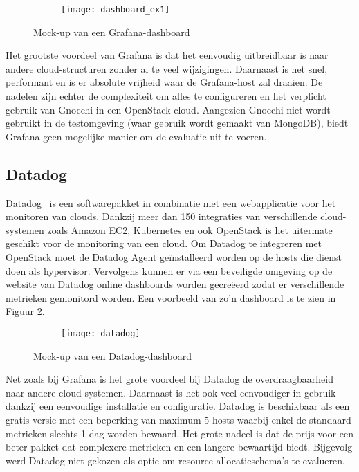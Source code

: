 \begin{figure}
  \centering
  \captionsetup{justification=centering}
  \begin{subfigure}{\textwidth}
    \centering
    \centerline{
      \texttt{[image: dashboard\_ex1]}
    }
  \end{subfigure}
  \caption{Mock-up van een Grafana-dashboard}
  \label{fig:grafana}
\end{figure}

Het grootste voordeel van Grafana is dat het eenvoudig uitbreidbaar is naar andere cloud-structuren zonder al te veel wijzigingen. Daarnaast is het snel, performant en is er absolute vrijheid waar de Grafana-host zal draaien. De nadelen zijn echter de complexiteit om alles te configureren en het verplicht gebruik van Gnocchi in een OpenStack-cloud. Aangezien Gnocchi niet wordt gebruikt in de testomgeving (waar gebruik wordt gemaakt van MongoDB), biedt Grafana geen mogelijke manier om de evaluatie uit te voeren.

\subsection{Datadog}

Datadog~\cite{Datadog} is een softwarepakket in combinatie met een webapplicatie voor het monitoren van clouds. Dankzij meer dan 150 integraties van verschillende cloud-systemen zoals Amazon EC2, Kubernetes en ook OpenStack is het uitermate geschikt voor de monitoring van een cloud. Om Datadog te integreren met OpenStack moet de Datadog Agent geïnstalleerd worden op de hosts die dienst doen als hypervisor. Vervolgens kunnen er via een beveiligde omgeving op de website van Datadog online dashboards worden gecreëerd zodat er verschillende metrieken gemonitord worden. Een voorbeeld van zo'n dashboard is te zien in Figuur \ref{fig:datadog}.

\begin{figure}
  \centering
  \captionsetup{justification=centering}
  \begin{subfigure}{\textwidth}
    \centering
    \centerline{
      \texttt{[image: datadog]}
    }
  \end{subfigure}
  \caption{Mock-up van een Datadog-dashboard}
  \label{fig:datadog}
\end{figure}

Net zoals bij Grafana is het grote voordeel bij Datadog de overdraagbaarheid naar andere cloud-systemen. Daarnaast is het ook veel eenvoudiger in gebruik dankzij een eenvoudige installatie en configuratie. Datadog is beschikbaar als een gratis versie met een beperking van maximum 5 hosts waarbij enkel de standaard metrieken slechts 1 dag worden bewaard. Het grote nadeel is dat de prijs voor een beter pakket dat complexere metrieken en een langere bewaartijd biedt. Bijgevolg werd Datadog niet gekozen als optie om resource-allocatieschema's te evalueren.

